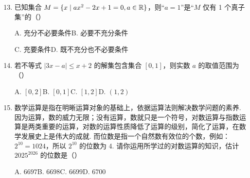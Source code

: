 \documentclass[a4paper,11pt]{article}
\begin{document}
\begin{enumerate}
\setcounter{enumi}{12}

\item 已知集合 $M=\{x\mid ax^2-2x+1=0,a\in\mathbb{R}\}$，则“$a=1$”是“$M$ 仅有 1 个真子集”的\mbox{（\quad）}

\keepwithprev
A. 充分不必要条件\qquad B. 必要不充分条件

C. 充要条件\qquad D. 既不充分也不必要条件

\ifanswer
\solbegin
{}
\solend
\fi

\item 若不等式 $|3x-a|\leqslant x+2$ 的解集包含集合 $[0,1]$，则实数 $a$ 的取值范围为\mbox{（\quad）}

\keepwithprev
A. $[0,2]$\qquad B. $[0,1]$\qquad C. $[1,2]$\qquad D. $(1,2)$

\ifanswer
\solbegin
\solend
\fi

\item 数学运算是指在明晰运算对象的基础上，依据运算法则解决数学问题的素养. 因为运算，数的威力无限；没有运算，数就只是一个符号，对数运算与指数运算是两类重要的运算，对数的运算性质降低了运算的级别，简化了运算，在数学发展史上是伟大的成就. 而位数是指一个自然数有效位的个数，例如：$2^{10}=1024$，所以 $2^{10}$ 的位数为 4. 请你运用所学过的对数运算的知识，估计 $2025^{2026}$ 的位数是\mbox{（\quad）}

\keepwithprev
A. $6697$\qquad B. $6698$\qquad C. $6699$\qquad D. $6700$

\ifanswer
\solbegin
{}
\solend
\fi


\end{enumerate}
\end{document}
